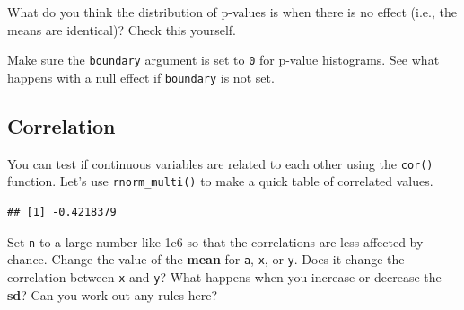 \documentclass[
  oneside]{book}
\newenvironment{Shaded}{\begin{snugshade}}{\end{snugshade}}
\newcommand{\AttributeTok}[1]{\textcolor[rgb]{0.77,0.63,0.00}{#1}}
\newcommand{\DecValTok}[1]{\textcolor[rgb]{0.00,0.00,0.81}{#1}}
\newcommand{\FloatTok}[1]{\textcolor[rgb]{0.00,0.00,0.81}{#1}}
\newcommand{\FunctionTok}[1]{\textcolor[rgb]{0.00,0.00,0.00}{#1}}
\newcommand{\NormalTok}[1]{#1}
\newcommand{\OtherTok}[1]{\textcolor[rgb]{0.56,0.35,0.01}{#1}}
\newcommand{\SpecialCharTok}[1]{\textcolor[rgb]{0.00,0.00,0.00}{#1}}
\newcommand{\StringTok}[1]{\textcolor[rgb]{0.31,0.60,0.02}{#1}}
\begin{document}
\begin{try}
What do you think the distribution of p-values is
when there is no effect (i.e., the means are identical)? Check this yourself.

\end{try}

\begin{warning}
Make sure the \texttt{boundary} argument is set to \texttt{0} for p-value histograms. See what happens with a null effect if \texttt{boundary} is not set.

\end{warning}

\hypertarget{correlation}{%
\subsection{Correlation}\label{correlation}}

You can test if continuous variables are related to each other using the \texttt{cor()} function. Let's use \texttt{rnorm\_multi()} to make a quick table of correlated values.

\begin{Shaded}
\end{Shaded}

\begin{verbatim}
## [1] -0.4218379
\end{verbatim}

\begin{try}
Set \texttt{n} to a large number like 1e6 so that the correlations are less affected by chance. Change the value of the \textbf{mean} for \texttt{a}, \texttt{x}, or \texttt{y}. Does it change the correlation between \texttt{x} and \texttt{y}? What happens when you increase or decrease the \textbf{sd}? Can you work out any rules here?

\end{try}
\end{document}
